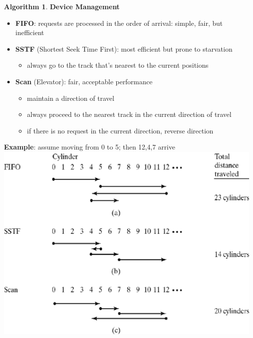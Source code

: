\documentclass[11pt,a4paper]{article}
\theoremstyle{definition}
\newtheorem{algoalgorithm}{Algorithm}[section]
\newenvironment{myitemize}
{ \begin{itemize}
    \setlength{\itemsep}{5pt}
    \setlength{\parskip}{0pt}
    \setlength{\parsep}{0pt}     }
{ \end{itemize}                  }
\begin{document}
\begin{algoalgorithm}{\textbf{Device Management}}

	\begin{minipage}{0.55\linewidth}
		\begin{myitemize}
		\item \textbf{FIFO}: requests are processed in the order of arrival: simple, fair, but inefficient
		\item \textbf{SSTF} (Shortest Seek Time First): most efficient but prone to starvation
		\begin{myitemize}
			\item always go to the track that’s nearest to the current positions
		\end{myitemize} 
		\item \textbf{Scan} (Elevator): fair, acceptable performance
		\begin{myitemize}
			\item maintain a direction of travel
			\item always proceed to the nearest track in the current direction of travel
			\item if there is no request in the current direction, reverse direction
		\end{myitemize}
	\end{myitemize}
	\end{minipage}\hspace{5mm}
	\begin{minipage}{0.4\linewidth}
	
		\textbf{Example}: assume moving from 0 to 5; then 12,4,7 arrive
		\includegraphics[width=\linewidth]{m3/deviceManagementAlgo}
	\end{minipage}
	
\end{algoalgorithm}






\end{document}
